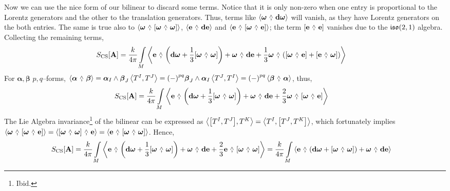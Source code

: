 Now we can use the nice form of our bilinear to discard some terms. Notice that it is only non-zero when one entry 
is proportional to the Lorentz generators and the other to the translation generators. Thus, terms like $\expval{\boldsymbol\omega\ \wedgecomma\ \vb d\boldsymbol\omega}$ will vanish, as they have Lorentz 
generators on the both entries. The same is true also to $\expval{\boldsymbol\omega\ \wedgecomma\ \wedgecomm{\boldsymbol\omega}{\boldsymbol\omega}}$, $\expval{\vb e\ \wedgecomma\ \vb d\vb e}$ and $\expval{\vb e\ \wedgecomma\ \wedgecomm{\boldsymbol\omega}{\vb e}}$; the term $\wedgecomm{\vb e}{\vb e}$ vanishes due to the $\mathfrak{iso}\qty(2,1)$ algebra. 
Collecting the remaining terms,
\begin{align*}
    S_{\textnormal{CS}}\qty[\vb A]&=\frac{k}{4\pi}\int\limits_M\expval{\vb e\ \wedgecomma\ \qty( \vb d{\boldsymbol\omega}+\frac13 \wedgecomm{\boldsymbol\omega}{\boldsymbol\omega})+\boldsymbol\omega\ \wedgecomma\ \vb d{\vb e}+\frac13\boldsymbol\omega\ \wedgecomma\ \qty(\wedgecomm{\boldsymbol\omega}{\vb e}+\wedgecomm{\vb e}{\boldsymbol\omega})}
\end{align*}
For $\boldsymbol\alpha,\boldsymbol\beta$ $p,q$--forms, $\expval{\boldsymbol\alpha\ \wedgecomma\ \boldsymbol\beta}=\boldsymbol\alpha_I\wedge\boldsymbol\beta_J\expval{T^I,T^J}=\qty(-)^{pq}\boldsymbol\beta_J\wedge\boldsymbol\alpha_I\expval{T^J,T^I}=\qty(-)^{pq}\expval{\boldsymbol\beta\ \wedgecomma\ \boldsymbol\alpha}$, thus,
\begin{align*}
    S_{\textnormal{CS}}\qty[\vb A]&=\frac{k}{4\pi}\int\limits_M\expval{\vb e\ \wedgecomma\ \qty( \vb d{\boldsymbol\omega}+\frac13 \wedgecomm{\boldsymbol\omega}{\boldsymbol\omega})+\boldsymbol\omega\ \wedgecomma\ \vb d{\vb e}+\frac23\boldsymbol\omega\ \wedgecomma\ \wedgecomm{\boldsymbol\omega}{\vb e}}
\end{align*}
The Lie Algebra invariance\footnote{Ibid.} of the bilinear can be expressed as $\expval{\comm{T^I}{T^J},{T^K}}=\expval{T^I,\comm{T^J}{T^K}}$, which fortunately implies $\expval{\boldsymbol\omega\ \wedgecomma\ \wedgecomm{\boldsymbol\omega}{\vb e}}=\expval{\wedgecomm{\boldsymbol\omega}{\boldsymbol\omega}\ \wedgecomma\ \vb e}=\expval{\vb e\ \wedgecomma\ \wedgecomm{\boldsymbol\omega}{\boldsymbol\omega}}$. 
Hence,
\begin{align*}
    S_{\textnormal{CS}}\qty[\vb A]&=\frac{k}{4\pi}\int\limits_M\expval{\vb e\ \wedgecomma\ \qty( \vb d{\boldsymbol\omega}+\frac13 \wedgecomm{\boldsymbol\omega}{\boldsymbol\omega})+\boldsymbol\omega\ \wedgecomma\ \vb d{\vb e}+\frac23\vb e\ \wedgecomma\ \wedgecomm{\boldsymbol\omega}{\boldsymbol\omega}}=\frac{k}{4\pi}\int\limits_M\expval{\vb e\ \wedgecomma\ \qty( \vb d{\boldsymbol\omega}+ \wedgecomm{\boldsymbol\omega}{\boldsymbol\omega})+\boldsymbol\omega\ \wedgecomma\ \vb d{\vb e}}
\end{align*}
